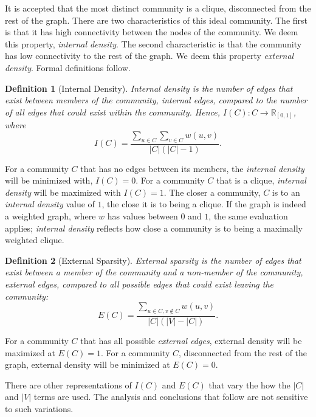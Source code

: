 \documentclass[phd,tocprelim]{cornell}
\newtheorem{definition}{Definition}
\begin{document}
It is accepted that the most distinct community is a clique, disconnected from the rest of the graph.  There are two characteristics of this ideal community.  The first is that it has high connectivity between the nodes of the community.  We deem this property, {\it internal density}.  The second characteristic is that the community has low connectivity to the rest of the graph.  We deem this property {\it external density}.  Formal definitions follow.

\begin{definition}[Internal Density]
Internal density is the number of edges that exist between members of the community, {\it internal edges}, compared to the number of all edges that could exist within the community.  Hence, $I(C) : C \rightarrow \mathbb{R}_{[0, 1]}$, where
\begin{equation}
 I(C) =\frac{\sum_{u \in C} \sum_{v \in C} w(u,v)}{|C|(|C| - 1)} .
\end{equation}
\label{def_int_density}
\end{definition}

For a community $C$ that has no edges between its members, the {\it internal density} will be minimized with, $I(C) = 0$.  For a community $C$ that is a clique, {\it internal density} will be maximized with $I(C) = 1$.  The closer a community, $C$ is to an {\it internal density} value of $1$, the close it is to being a clique.  If the graph is indeed a weighted graph, where $w$ has values between $0$ and $1$, the same evaluation applies; {\it internal density} reflects how close a community is to being a maximally weighted clique.

\begin{definition}[External Sparsity]
External sparsity is the number of edges that exist between a member of the community and a non-member of the community, {\it external edges}, compared to all possible edges that could exist leaving the community:
\begin{equation}
 E(C) = \frac{\sum_{u \in C, v \notin C} w(u,v)}{|C|(|V| - |C|)}.
\end{equation}
\label{def_ext_density}
\end{definition}

For a community $C$ that has all possible {\it external edges}, external density will be maximized at $E(C)=1$.  For a community $C$, disconnected from the rest of the graph, external density will be minimized at $E(C) = 0$.

There are other representations of $I(C)$ and $E(C)$ that vary the how the $|C|$ and $|V|$ terms are used.  The analysis and conclusions that follow are not sensitive to such variations.
\end{document}
